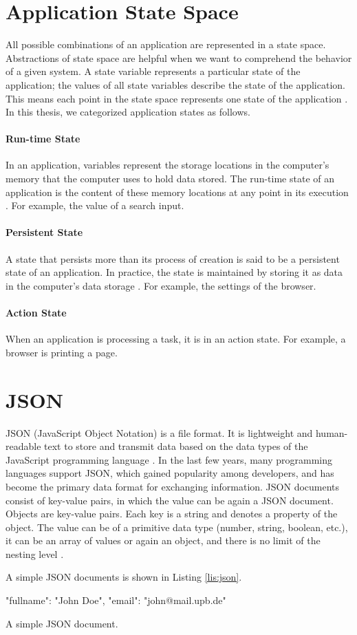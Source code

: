 \section{Application State Space}
All possible combinations of an application are represented in a state space. Abstractions of state space are helpful when we want to comprehend the behavior of a given system. A state variable represents a particular state of the application; the values of all state variables describe the state of the application. This means each point in the state space represents one state of the application \cite{state-space}. In this thesis, we categorized application states as follows.

\paragraph{Run-time State}
In an application, variables represent the storage locations in the computer's memory that the computer uses to hold data stored. The run-time state of an application is the content of these memory locations at any point in its execution \cite{Laplante2000-ui}. For example, the value of a search input.

\paragraph{Persistent State}
A state that persists more than its process of creation is said to be a persistent state of an application. In practice, the state is maintained by storing it as data in the computer's data storage \cite{pstate}. For example, the settings of the browser.


\paragraph{Action State}
When an application is processing a task, it is in an action state. For example, a browser is printing a page.

\section{JSON}
JSON (JavaScript Object Notation) is a file format. It is lightweight and human-readable text to store and transmit data based on the data types of the JavaScript programming language \cite{json}. In the last few years, many programming languages support JSON, which gained popularity among developers, and has become the primary data format for exchanging information. JSON documents consist of key-value pairs, in which the value can be again a JSON document. Objects are key-value pairs. Each key is a string and denotes a property of the object. The value can be of a primitive data type (number, string, boolean, etc.), it can be an array of values or again an object, and there is no limit of the nesting level \cite{json-schema}. 

A simple JSON documents is shown in Listing \ref{lis:json}.

\FloatBarrier
\begin{code}
\begin{json}
{
    "fullname": "John Doe",
    "email": "john@mail.upb.de"
}
\end{json}
\caption{A simple JSON document.}
\label{lis:json}
\end{code}
\FloatBarrier
